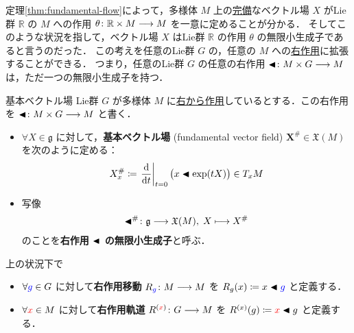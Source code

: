 \documentclass[TQFT_main]{subfiles}
\begin{document}
定理\ref{thm:fundamental-flow}によって，\cinfty 多様体 $M$ 上の\hyperref[def:vecf-complete]{完備}なベクトル場 $X$ がLie群 $\mathbb{R}$ の $M$ への作用 $\theta \colon \mathbb{R} \times M \longrightarrow M$ を一意に定めることが分かる．
そしてこのような状況を指して，ベクトル場 $X$ はLie群 $\mathbb{R}$ の作用 $\theta$ の無限小生成子であると言うのだった．
この考えを任意のLie群 $G$ の，任意の $M$ への\underline{右作用}に拡張することができる．
つまり，任意のLie群 $G$ の任意の右作用 $\blacktriangleleft \colon M \times G \longrightarrow M$ は，ただ一つの無限小生成子を持つ．

\begin{mydef}[label=def:fundamental-vecf]{基本ベクトル場}
    Lie群 $G$ が\cinfty 多様体 $M$ に\hyperref[def:Lie-action]{右から作用}しているとする．この右作用を $\blacktriangleleft \colon M \times G \longrightarrow M$ と書く．
    \begin{itemize}
        \item $\forall X \in \mathfrak{g}$ に対して，\textbf{基本ベクトル場} (fundamental vector field) $\bm{X^{\#}} \in \mathfrak{X}(M)$ を次のように定める：
        \begin{align}
            X^{\#}_x \coloneqq \eval{\dv{}{t}}_{t=0} \bigl(x \btl \exp(tX)\bigr) \in T_x M
        \end{align}
        \item 写像
        \begin{align}
            \blacktriangleleft^{\#} \colon \mathfrak{g} \longrightarrow \mathfrak{X}(M),\; X \longmapsto X^\#
        \end{align}
        のことを\textbf{右作用 $\blacktriangleleft$ の無限小生成子}と呼ぶ．
    \end{itemize}
    \tcblower
    上の状況下で
    \begin{itemize}
        \item $\forall \textcolor{blue}{g} \in G$ に対して\textbf{右作用移動} $R_{\textcolor{blue}{g}} \colon M \longrightarrow M$ を $R_g (x) \coloneqq x \blacktriangleleft \textcolor{blue}{g}$ と定義する．
        \item $\forall \textcolor{red}{x} \in M$ に対して\textbf{右作用軌道} $R^{(\textcolor{red}{x})} \colon G \longrightarrow M$ を $R^{(x)} (g) \coloneqq \textcolor{red}{x} \blacktriangleleft g$ と定義する．
    \end{itemize}
\end{mydef}
\end{document}
